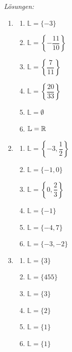 \clearpage
\emph{Lösungen:}
\begin{enumerate}
    \item
          \begin{enumerate}
              \item \(\mathbb{L}=\{-3\}\)
              \item \(\mathbb{L}=\left\{-\dfrac{11}{10}\right\}\)
              \item \(\mathbb{L}=\left\{\dfrac{7}{11}\right\}\)
              \item \(\mathbb{L}=\left\{\dfrac{20}{33}\right\}\)
              \item \(\mathbb{L}=\emptyset\)
              \item \(\mathbb{L}=\mathbb{R}\)
          \end{enumerate}

    \item
          \begin{enumerate}
              \item \(\mathbb{L}=\left\{-3,\dfrac{1}{2}\right\}\)
              \item \(\mathbb{L}=\{-1,0\}\)
              \item \(\mathbb{L}=\left\{0,\dfrac{2}{3}\right\}\)
              \item \(\mathbb{L}=\{-1\}\)
              \item \(\mathbb{L}=\{-4,7\}\)
              \item \(\mathbb{L}=\{-3,-2\}\)
          \end{enumerate}

    \item
          \begin{enumerate}
              \item \(\mathbb{L}=\{3\}\)
              \item \(\mathbb{L}=\{455\}\)
              \item \(\mathbb{L}=\{3\}\)
              \item \(\mathbb{L}=\{2\}\)
              \item \(\mathbb{L}=\{1\}\)
              \item \(\mathbb{L}=\{1\}\)
          \end{enumerate}
\end{enumerate}
















